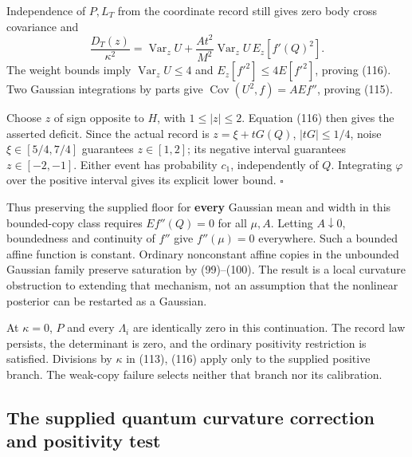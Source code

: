 \documentclass[11pt,a4paper]{article}
\begin{document}
Independence of \(P,L_T\) from the coordinate record still gives zero
body cross covariance and \[\frac{D_T(z)}{\kappa^2}
=\operatorname{Var}_zU
 +\frac{At^2}{M^2}\operatorname{Var}_zU\,E_z[f'(Q)^2].\] The weight
bounds imply \(\operatorname{Var}_zU\le4\) and \(E_z[f'^2]\le4E[f'^2]\),
proving (116). Two Gaussian integrations by parts give
\(\operatorname{Cov}(U^2,f)=A Ef''\), proving (115).

Choose \(z\) of sign opposite to \(H\), with \(1\le|z|\le2\). Equation
(116) then gives the asserted deficit. Since the actual record is
\(z=\xi+tG(Q)\), \(|tG|\le1/4\), noise \(\xi\in[5/4,7/4]\) guarantees
\(z\in[1,2]\); its negative interval guarantees \(z\in[-2,-1]\). Either
event has probability \(c_1\), independently of \(Q\). Integrating
\(\varphi\) over the positive interval gives its explicit lower bound.
\(\square\)

Thus preserving the supplied floor for \textbf{every} Gaussian mean and
width in this bounded-copy class requires \(Ef''(Q)=0\) for all
\(\mu,A\). Letting \(A\downarrow0\), boundedness and continuity of
\(f''\) give \(f''(\mu)=0\) everywhere. Such a bounded affine function
is constant. Ordinary nonconstant affine copies in the unbounded
Gaussian family preserve saturation by (99)--(100). The result is a
local curvature obstruction to extending that mechanism, not an
assumption that the nonlinear posterior can be restarted as a Gaussian.

At \(\kappa=0\), \(P\) and every \(\Lambda_i\) are identically zero in
this continuation. The record law persists, the determinant is zero, and
the ordinary positivity restriction is satisfied. Divisions by
\(\kappa\) in (113), (116) apply only to the supplied positive branch.
The weak-copy failure selects neither that branch nor its calibration.

\hypertarget{the-supplied-quantum-curvature-correction-and-positivity-test}{%
\subsection{The supplied quantum curvature correction and positivity
test}\label{the-supplied-quantum-curvature-correction-and-positivity-test}}
\end{document}
